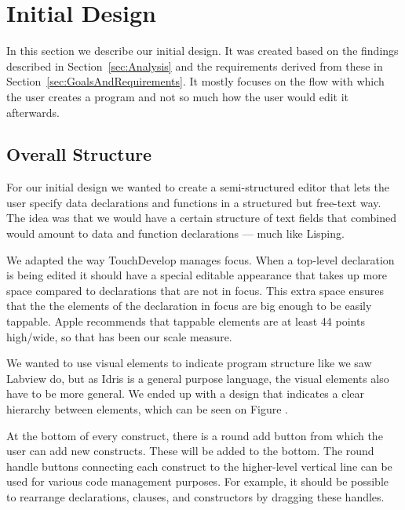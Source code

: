 \section{Initial Design}
\label{sec:InitialDesign}

In this section we describe our initial design. It was created based on the
findings described in Section~\ref{sec:Analysis} and the requirements derived
from these in Section~\ref{sec:GoalsAndRequirements}. It mostly focuses on the
flow with which the user creates a program and not so much how the user would
edit it afterwards.

\subsection{Overall Structure}
For our initial design we wanted to create a semi-structured editor that lets
the user specify data declarations and functions in a structured but free-text way. The idea was that we would have a certain structure of text fields that
combined would amount to data and function declarations --- much like Lisping.

We adapted the way TouchDevelop manages focus. When a top-level declaration is
being edited it should have a special editable appearance that takes up more
space compared to declarations that are not in focus. This extra space ensures
that the the elements of the declaration in focus are big enough to be easily
tappable. Apple recommends that tappable elements are at least 44 points high/wide, so that has been our scale measure.

We wanted to use visual elements to indicate program structure like we saw
Labview do, but as Idris is a general purpose language, the visual elements
also have to be more general. We ended up with a design that indicates a clear
hierarchy between elements, which can be seen on Figure .

\missingfigure{}

At the bottom of every construct, there is a round add button from which the user can add new constructs. These will be added to the bottom. The round handle buttons connecting each construct to the higher-level vertical line
can be used for various code management purposes. For example, it should be
possible to rearrange declarations, clauses, and constructors by dragging these
handles. 

